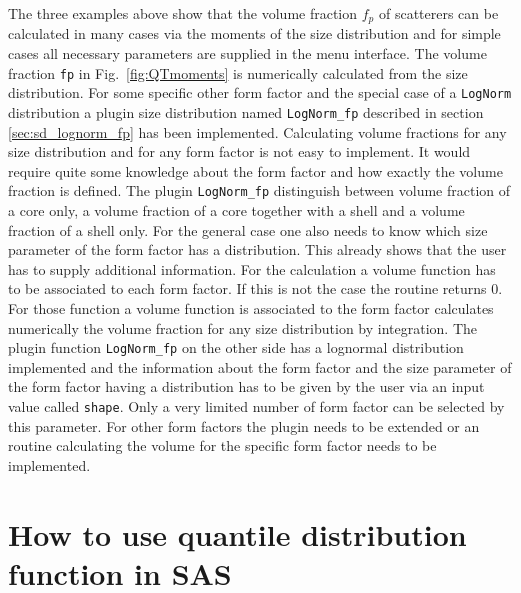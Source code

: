 The three examples above show that the volume fraction $f_p$ of
scatterers can be calculated in many cases via the moments of the
size distribution and for simple cases all necessary parameters are
supplied in the \SASfit menu interface. The volume fraction
\texttt{fp} in Fig.\ \ref{fig:QTmoments} is numerically calculated
from the size distribution. For some specific other form factor and
the special case of a \texttt{LogNorm} distribution a plugin size
distribution named \texttt{LogNorm\_fp} described in section
\ref{sec:sd_lognorm_fp} has been implemented. Calculating volume
fractions for any size distribution and for any form factor is not
easy to implement. It would require quite some knowledge about the
form factor and how exactly the volume fraction is defined. The
plugin \texttt{LogNorm\_fp} distinguish between volume fraction of a
core only, a volume fraction of a core together with a shell and a
volume fraction of a shell only. For the general case one also needs
to know which size parameter of the form factor has a distribution.
This already shows that the user has to supply additional
information. For the calculation a volume function has to be
associated to each form factor. If this is not the case the \SASfit
routine returns 0. For those function a volume function is
associated to the form factor \SASfit calculates numerically the
volume fraction for any size distribution by integration. The plugin
function \texttt{LogNorm\_fp} on the other side has a lognormal
distribution implemented and the information about the form factor
and the size parameter of the form factor having a distribution has
to be given by the user via an input value called \texttt{shape}.
Only a very limited number of form factor can be selected by this
parameter. For other form factors the plugin needs to be extended or
an routine calculating the volume for the specific form factor needs
to be implemented.

\section{How to use quantile distribution function in SAS}

